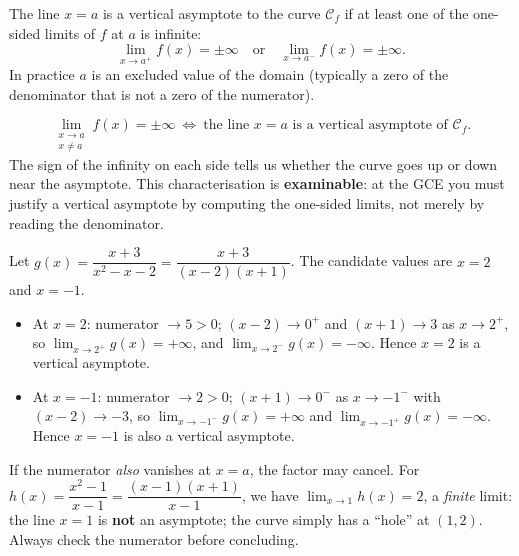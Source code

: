 \documentclass[11pt]{article}
\newcommand{\cle}[1]{{\popxbold\color{popdark}#1}}
\begin{document}
\begin{definition}
The line $x=a$ is a \cle{vertical asymptote} to the curve $\mathcal{C}_f$ if at least one of the one-sided limits of $f$ at $a$ is infinite:
\[ \lim_{x\to a^{+}} f(x)=\pm\infty \quad\text{or}\quad \lim_{x\to a^{-}} f(x)=\pm\infty. \]
In practice $a$ is an excluded value of the domain (typically a zero of the denominator that is not a zero of the numerator).
\end{definition}

\begin{propriete}
\[ \lim_{\substack{x\to a\\ x\ne a}} f(x)=\pm\infty \ \Longleftrightarrow\ \text{the line } x=a \text{ is a vertical asymptote of } \mathcal{C}_f. \]
The sign of the infinity on each side tells us whether the curve goes up or down near the asymptote. This characterisation is \textbf{examinable}: at the GCE you must justify a vertical asymptote by computing the one-sided limits, not merely by reading the denominator.
\end{propriete}

\begin{exemplebox}
Let $g(x)=\dfrac{x+3}{x^{2}-x-2}=\dfrac{x+3}{(x-2)(x+1)}$. The candidate values are $x=2$ and $x=-1$.
\begin{itemize}
\item At $x=2$: numerator $\to 5>0$; $(x-2)\to 0^{+}$ and $(x+1)\to 3$ as $x\to 2^{+}$, so $\displaystyle\lim_{x\to 2^{+}}g(x)=+\infty$, and $\displaystyle\lim_{x\to 2^{-}}g(x)=-\infty$. Hence $x=2$ is a vertical asymptote.
\item At $x=-1$: numerator $\to 2>0$; $(x+1)\to 0^{-}$ as $x\to -1^{-}$ with $(x-2)\to -3$, so $\displaystyle\lim_{x\to -1^{-}}g(x)=+\infty$ and $\displaystyle\lim_{x\to -1^{+}}g(x)=-\infty$. Hence $x=-1$ is also a vertical asymptote.
\end{itemize}
\end{exemplebox}

\begin{attention}
If the numerator \emph{also} vanishes at $x=a$, the factor may cancel. For $h(x)=\dfrac{x^{2}-1}{x-1}=\dfrac{(x-1)(x+1)}{x-1}$, we have $\displaystyle\lim_{x\to 1}h(x)=2$, a \emph{finite} limit: the line $x=1$ is \textbf{not} an asymptote; the curve simply has a ``hole'' at $(1,2)$. Always check the numerator before concluding.
\end{attention}
\end{document}
